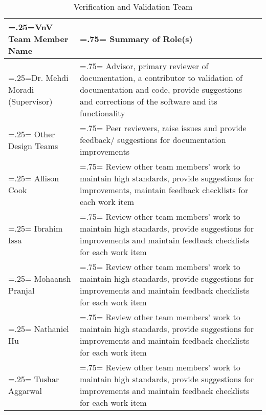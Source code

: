 \documentclass[12pt, titlepage]{article}
\begin{document}
\begin{table}[H]
    \centering
    \begin{tabularx}{\textwidth}{|>{\centering\arraybackslash\hsize=.25\hsize\linewidth=\hsize}X|>{\centering\arraybackslash\hsize=.75\hsize\linewidth=\hsize}X|}
        \hline
        \textbf{VnV Team Member Name} & \textbf{Summary of Role(s)} \\
        \hline
        Dr. Mehdi Moradi (Supervisor) & Advisor, primary reviewer of documentation, a contributor to validation of documentation and code, provide suggestions and corrections of the software and its functionality \\
        \hline
        Other Design Teams & Peer reviewers, raise issues and provide feedback/ suggestions for documentation improvements \\
        \hline
        Allison Cook & Review other team members' work to maintain high standards, provide suggestions for improvements, maintain feedback checklists for each work item \\
        \hline
        Ibrahim Issa & Review other team members' work to maintain high standards, provide suggestions for improvements and maintain feedback checklists for each work item \\
        \hline
        Mohaansh Pranjal & Review other team members' work to maintain high standards, provide suggestions for improvements and maintain feedback checklists for each work item \\
        \hline
        Nathaniel Hu & Review other team members' work to maintain high standards, provide suggestions for improvements and maintain feedback checklists for each work item \\
        \hline
        Tushar Aggarwal & Review other team members' work to maintain high standards, provide suggestions for improvements and maintain feedback checklists for each work item \\
        \hline
    \end{tabularx}
    \caption{Verification and Validation Team}
    \label{tab:VnVTeam}
\end{table}
\end{document}
